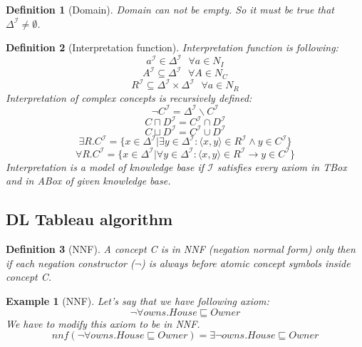\documentclass[12pt,a4paper]{article}
\newtheorem{definition}{Definition}[subsection]
\newtheorem{example}{Example}[subsection]
\begin{document}
\begin{definition}[Domain]
	Domain can not be empty. So it must be true that $\Delta^{\mathcal{I}} \not = \emptyset$.
\end{definition}

\begin{definition}[Interpretation function]
	Interpretation function is following:
	\[ a^{\mathcal{I}} \in \Delta^{\mathcal{I}} \text{ } \forall a \in N_{I} \]
	\[ A^{\mathcal{I}} \subseteq \Delta^{\mathcal{I}} \text{ } \forall A \in N_{C} \]
	\[ R^{\mathcal{I}} \subseteq \Delta^{\mathcal{I}} \times \Delta^{\mathcal{I}} \text{ } \forall a \in N_{R} \]
	Interpretation of complex concepts is recursively defined:
	\[ \neg C^{\mathcal{I}} = \Delta^{\mathcal{I}} \backslash C^{\mathcal{I}} \]
	\[ C \sqcap D^{\mathcal{I}} = C^{\mathcal{I}} \cap D^{\mathcal{I}} \]
	\[ C \sqcup D^{\mathcal{I}} = C^{\mathcal{I}} \cup D^{\mathcal{I}} \]
	\[ \exists R.C^{\mathcal{I}} = \{ x \in \Delta^{\mathcal{I}} | \exists y \in \Delta^{\mathcal{I}} : \langle x,y \rangle \in R^{\mathcal{I}} \land y \in C^{\mathcal{I}} \} \]
	\[ \forall R.C^{\mathcal{I}} = \{ x \in \Delta^{\mathcal{I}} | \forall y \in \Delta^{\mathcal{I}} : \langle x,y \rangle \in R^{\mathcal{I}} \rightarrow y \in C^{\mathcal{I}} \} \]
	Interpretation is a model of knowledge base if $\mathcal{I}$ satisfies every axiom in \textit{TBox} and in \textit{ABox} of given knowledge base.
\end{definition}

\subsection{DL Tableau algorithm}


\begin{definition}[NNF]
A concept C is in NNF (negation normal form) only then if each negation constructor ($\neg$) is always before atomic concept symbols inside concept C.
\end{definition}

\begin{example}[NNF]
Let's say that we have following axiom:
\[ \neg \forall owns.House \sqsubseteq Owner \]
We have to modify this axiom to be in NNF.
\[ nnf(\neg \forall owns.House \sqsubseteq Owner) = \exists \neg owns.House \sqsubseteq Owner \]
\end{example}
\end{document}
